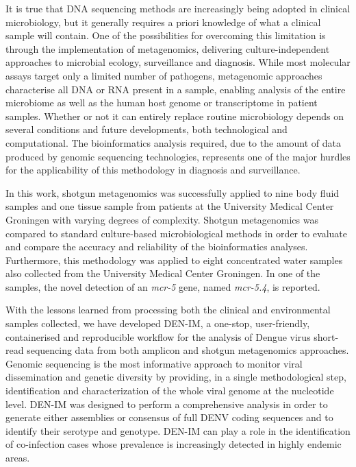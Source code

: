 It is true that DNA sequencing methods are increasingly being adopted in clinical microbiology, but it generally requires a priori knowledge of what a clinical sample will contain. One of the possibilities for overcoming this limitation is through the implementation of metagenomics, delivering culture-independent approaches to microbial ecology, surveillance and diagnosis. While most molecular assays target only a limited number of pathogens, metagenomic approaches characterise all DNA or RNA present in a sample, enabling analysis of the entire microbiome as well as the human host genome or transcriptome in patient samples. Whether or not it can entirely replace routine microbiology depends on several conditions and future developments, both technological and computational. The bioinformatics analysis required, due to the amount of data produced by genomic sequencing technologies, represents one of the major hurdles for the applicability of this methodology in diagnosis and surveillance. 

In this work, shotgun metagenomics was successfully applied to nine body fluid samples and one tissue sample from patients at the University Medical Center Groningen with varying degrees of complexity. Shotgun metagenomics was compared to standard culture-based microbiological methods in order to evaluate and compare the accuracy and reliability of the bioinformatics analyses. Furthermore, this methodology was applied to eight concentrated water samples also collected from the University Medical Center Groningen. In one of the samples, the novel detection of an \textit{mcr-5} gene, named \textit{mcr-5.4}, is reported.

With the lessons learned from processing both the clinical and environmental samples collected, we have developed DEN-IM, a one-stop, user-friendly, containerised and reproducible workflow for the analysis of Dengue virus short-read sequencing data from both amplicon and shotgun metagenomics approaches. Genomic sequencing is the most informative approach to monitor viral dissemination and genetic diversity by providing, in a single methodological step, identification and characterization of the whole viral genome at the nucleotide level. DEN-IM was designed to perform a comprehensive analysis in order to generate either assemblies or consensus of full DENV coding sequences and to identify their serotype and genotype. DEN-IM can play a role in the identification of co-infection cases whose prevalence is increasingly detected in highly endemic areas.

